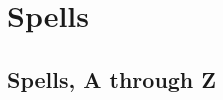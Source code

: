 \newcommand{\component}[1]{\textit{Material Component:} #1}
\newcommand{\focus}[1]{\textit{Focus:} #1}


\chapter{Spells}
\section{Spells, A through Z}



